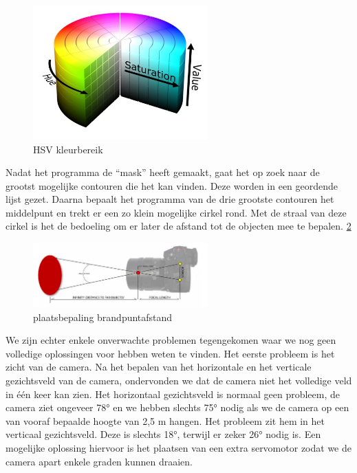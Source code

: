 \documentclass{kulakarticle}
\begin{document}
 \begin{figure}[H]
    \centering
    \label{fig_saturation}
	\includegraphics[width=0.6\textwidth]{Afbeeldingen/saturation.png}
    \caption{HSV kleurbereik}
 \end{figure}   




Nadat het programma de “mask” heeft gemaakt, gaat het op zoek naar de grootst mogelijke contouren die het kan vinden. Deze worden in een geordende lijst gezet. Daarna bepaalt het programma van de drie grootste contouren het middelpunt en trekt er een zo klein mogelijke cirkel rond. Met de straal van deze cirkel is het de bedoeling om er later de afstand  tot de objecten mee te bepalen. \ref{fig_focal}

\begin{figure}[h]
	\centering
        \label{fig_focal}
	\includegraphics[width=0.6\textwidth]{Afbeeldingen/plaatsbepaling.png}
        \caption{plaatsbepaling brandpuntafstand}
 
\end{figure}

We zijn echter enkele onverwachte problemen tegengekomen waar we nog geen volledige oplossingen voor hebben weten te vinden. Het eerste probleem is het zicht van de camera. Na het bepalen van het horizontale en het verticale gezichtsveld van de camera, ondervonden we dat de camera niet het volledige veld in één keer kan zien. Het horizontaal gezichtsveld is normaal geen probleem, de camera ziet ongeveer 78° en we hebben slechts 75° nodig als we de camera op een van vooraf bepaalde hoogte van 2,5 m hangen. Het probleem zit hem in het verticaal gezichtsveld. Deze is slechts 18°, terwijl er zeker  26° nodig is. Een mogelijke oplossing hiervoor is het plaatsen van een extra servomotor zodat we de camera apart enkele graden kunnen draaien.
\end{document}

